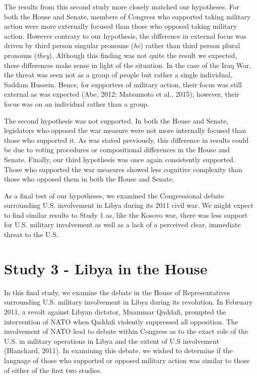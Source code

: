 \documentclass[english,,man,floatsintext]{apa6}
\begin{document}
The results from this second study more closely matched our hypotheses. For both the House and Senate, members of Congress who supported taking military action were more externally focused than those who opposed taking military action. However contrary to our hypothesis, the difference in external focus was driven by third person singular pronouns (\emph{he}) rather than third person plural pronouns (\emph{they}). Although this finding was not quite the result we expected, these differences make sense in light of the situation. In the case of the Iraq War, the threat was seen not as a group of people but rather a single individual, Saddam Hussein. Hence, for supporters of military action, their focus was still external as was expected (Abe, 2012; Matsumoto et al., 2015); however, their focus was on an individual rather than a group.

The second hypothesis was not supported. In both the House and Senate, legislators who opposed the war measure were not more internally focused than those who supported it. As was stated previously, this difference in results could be due to voting procedures or compositional differences in the House and Senate. Finally, our third hypothesis was once again consistently supported. Those who supported the war measures showed less cognitive complexity than those who opposed them in both the House and Senate.

As a final test of our hypotheses, we examined the Congressional debate surrounding U.S. involvement in Libya during its 2011 civil war. We might expect to find similar results to Study 1 as, like the Kosovo war, there was less support for U.S. military involvement as well as a lack of a perceived clear, immediate threat to the U.S.

\hypertarget{study-3---libya-in-the-house}{%
\section{Study 3 - Libya in the House}\label{study-3---libya-in-the-house}}

In this final study, we examine the debate in the House of Representatives surrounding U.S. military involvement in Libya during its revolution. In February 2011, a revolt against Libyan dictator, Muammar Qaddafi, prompted the intervention of NATO when Qaddafi violently suppressed all opposition. The involvement of NATO lead to debate within Congress as to the exact role of the U.S. in military operations in Libya and the extent of U.S involvement (Blanchard, 2011). In examining this debate, we wished to determine if the language of those who supported or opposed military action was similar to those of either of the first two studies.
\end{document}
